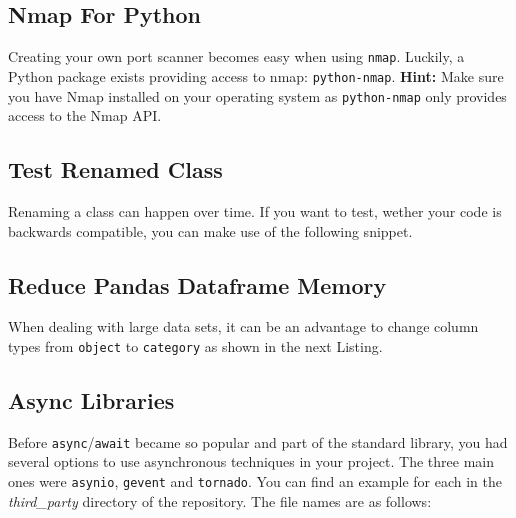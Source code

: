 


\subsection{Nmap For Python}

Creating your own port scanner becomes easy when using \lstinline{nmap}.
Luckily, a Python package exists providing access to nmap: \lstinline{python-nmap}.
\textbf{Hint:} Make sure you have Nmap installed on your operating system as \lstinline{python-nmap} only provides access to the Nmap API.




\subsection{Test Renamed Class}

Renaming a class can happen over time.
If you want to test, wether your code is backwards compatible, you can make use of the following snippet.




\subsection{Reduce Pandas Dataframe Memory}

When dealing with large data sets, it can be an advantage to change column types from \lstinline{object} to \lstinline{category} as shown in the next Listing.




\subsection{Async Libraries}

Before \lstinline{async}/\lstinline{await} became so popular and part of the standard library, you had several options to use asynchronous techniques in your project.
The three main ones were \lstinline{asynio}, \lstinline{gevent} and \lstinline{tornado}.
You can find an example for each in the \textit{third\_party} directory of the repository.
The file names are as follows:

